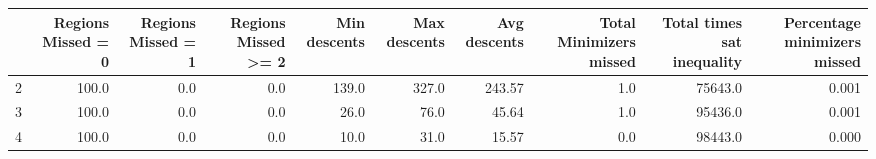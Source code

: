 \begin{tabular}{lrrrrrrrrr}
\toprule
{} &  Regions Missed = 0 &  Regions Missed = 1 &  Regions Missed >= 2 &  Min descents &  Max descents &  Avg descents &  Total Minimizers missed &  Total times sat inequality &  Percentage minimizers missed \\
\midrule
2 &               100.0 &                 0.0 &                  0.0 &         139.0 &         327.0 &        243.57 &                      1.0 &                     75643.0 &                         0.001 \\
3 &               100.0 &                 0.0 &                  0.0 &          26.0 &          76.0 &         45.64 &                      1.0 &                     95436.0 &                         0.001 \\
4 &               100.0 &                 0.0 &                  0.0 &          10.0 &          31.0 &         15.57 &                      0.0 &                     98443.0 &                         0.000 \\
\bottomrule
\end{tabular}
